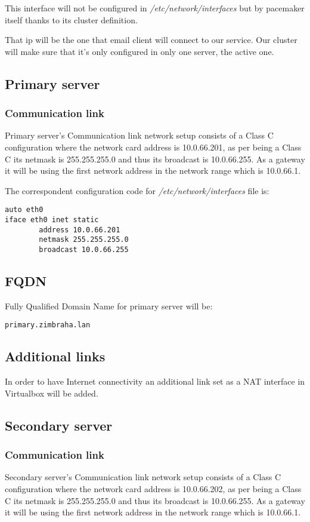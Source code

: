 This interface will not be configured in \textit{/etc/network/interfaces} but by pacemaker itself thanks to its cluster definition.

That ip will be the one that email client will connect to our service. Our cluster will make sure that it's only configured in only one server, the active one.

\subsection {Primary server}

\subsubsection {Communication link}
Primary server's Communication link network setup consists of a Class C configuration where the network card address is 10.0.66.201, as per being a Class C its netmask is 255.255.255.0 and thus its broadcast is 10.0.66.255. As a gateway it will be using the first network address in the network range which is 10.0.66.1.


The correspondent configuration code for \textit{/etc/network/interfaces} file is:
\begin{verbatim}
auto eth0
iface eth0 inet static
        address 10.0.66.201
        netmask 255.255.255.0
        broadcast 10.0.66.255
\end{verbatim}
\subsection {FQDN}
Fully Qualified Domain Name for primary server will be:
\begin{verbatim}
primary.zimbraha.lan
\end{verbatim}
\subsection {Additional links}
In order to have Internet connectivity an additional link set as a NAT interface in Virtualbox will be added.

\subsection {Secondary server}

\subsubsection {Communication link}
Secondary server's Communication link network setup consists of a Class C configuration where the network card address is 10.0.66.202, as per being a Class C its netmask is 255.255.255.0 and thus its broadcast is 10.0.66.255. As a gateway it will be using the first network address in the network range which is 10.0.66.1.

